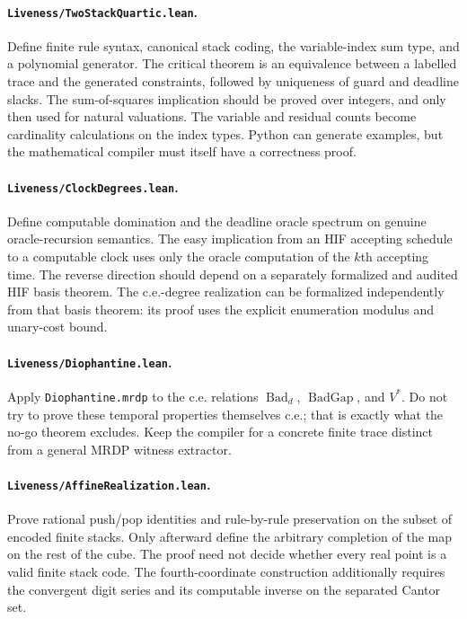 \documentclass[11pt,letterpaper]{article}
\theoremstyle{definition}
\theoremstyle{remark}
\newcommand{\code}[1]{\texttt{#1}}
\newcommand{\1}{\mathbf 1}
\begin{document}
\paragraph{\code{Liveness/TwoStackQuartic.lean}.}
Define finite rule syntax, canonical stack coding, the variable-index sum
type, and a polynomial generator. The critical theorem is an equivalence
between a labelled trace and the generated constraints, followed by
uniqueness of guard and deadline slacks. The sum-of-squares implication
should be proved over integers, and only then used for natural valuations.
The variable and residual counts become cardinality calculations on the
index types. Python can generate examples, but the mathematical compiler
must itself have a correctness proof.

\paragraph{\code{Liveness/ClockDegrees.lean}.}
Define computable domination and the deadline oracle spectrum on genuine
oracle-recursion semantics. The easy implication from an HIF accepting
schedule to a computable clock uses only the oracle computation of the
$k$th accepting time. The reverse direction should depend on a separately
formalized and audited HIF basis theorem. The c.e.-degree realization can
be formalized independently from that basis theorem: its proof uses the
explicit enumeration modulus and unary-cost bound.

\paragraph{\code{Liveness/Diophantine.lean}.}
Apply \code{Diophantine.mrdp} to the c.e. relations
$\operatorname{Bad}_d$, $\operatorname{BadGap}$, and $V^*$.
Do not try to prove these temporal properties themselves c.e.; that is
exactly what the no-go theorem excludes. Keep the compiler for a concrete
finite trace distinct from a general MRDP witness extractor.

\paragraph{\code{Liveness/AffineRealization.lean}.}
Prove rational push/pop identities and rule-by-rule preservation on the
subset of encoded finite stacks. Only afterward define the arbitrary
completion of the map on the rest of the cube. The proof need not decide
whether every real point is a valid finite stack code. The fourth-coordinate
construction additionally requires the convergent digit series and its
computable inverse on the separated Cantor set.
\end{document}
